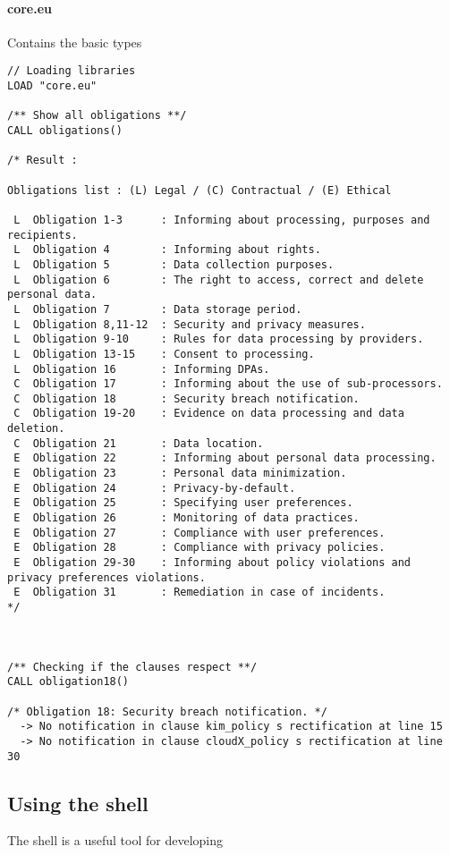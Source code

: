 \paragraph{core.eu} Contains the basic types
\begin{lstlisting}
// Loading libraries
LOAD "core.eu"

/** Show all obligations **/
CALL obligations() 

/* Result :

Obligations list : (L) Legal / (C) Contractual / (E) Ethical 

 L  Obligation 1-3      : Informing about processing, purposes and recipients. 
 L  Obligation 4        : Informing about rights. 
 L  Obligation 5        : Data collection purposes. 
 L  Obligation 6        : The right to access, correct and delete personal data. 
 L  Obligation 7        : Data storage period. 
 L  Obligation 8,11-12  : Security and privacy measures. 
 L  Obligation 9-10     : Rules for data processing by providers. 
 L  Obligation 13-15    : Consent to processing. 
 L  Obligation 16       : Informing DPAs. 
 C  Obligation 17       : Informing about the use of sub-processors. 
 C  Obligation 18       : Security breach notification. 
 C  Obligation 19-20    : Evidence on data processing and data deletion. 
 C  Obligation 21       : Data location. 
 E  Obligation 22       : Informing about personal data processing. 
 E  Obligation 23       : Personal data minimization. 
 E  Obligation 24       : Privacy-by-default. 
 E  Obligation 25       : Specifying user preferences. 
 E  Obligation 26       : Monitoring of data practices. 
 E  Obligation 27       : Compliance with user preferences. 
 E  Obligation 28       : Compliance with privacy policies. 
 E  Obligation 29-30    : Informing about policy violations and privacy preferences violations. 
 E  Obligation 31       : Remediation in case of incidents. 
*/



/** Checking if the clauses respect **/
CALL obligation18()

/* Obligation 18: Security breach notification. */
  -> No notification in clause kim_policy s rectification at line 15
  -> No notification in clause cloudX_policy s rectification at line 30

\end{lstlisting}




\subsection{Using the shell}
The shell is a useful tool for developing 



